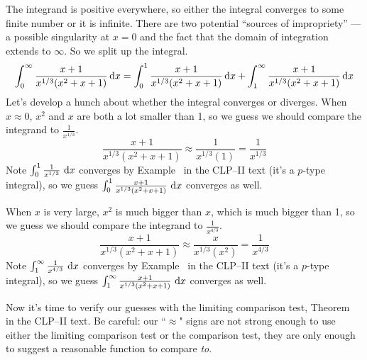 \begin{solution}
The integrand is positive everywhere, so either the integral
converges to some finite number or it is infinite. There are two potential
``sources of impropriety'' --- a possible singularity at $x=0$ and
the fact that the domain of integration extends to $\infty$.
So we split up the integral.
\begin{align*}
\int_0^\infty\frac{x+1}{x^{1/3}(x^2+x+1)}\,\mathrm{d}x
= \int_0^1\frac{x+1}{x^{1/3}(x^2+x+1)}\,\mathrm{d}x
  +\int_1^\infty\frac{x+1}{x^{1/3}(x^2+x+1)}\,\mathrm{d}x
\end{align*}
Let's develop a hunch about whether the integral converges or diverges. When $x\approx 0$,  $x^2$ and $x$ are both a lot smaller than 1, so we guess we should compare the integrand to $\frac{1}{x^{1/3}}$.
\begin{equation*}
\frac{x+1}{x^{1/3}(x^2+x+1)} \approx \frac{1}{x^{1/3}(1)} =
                                      \frac{1}{x^{1/3}}
\end{equation*}
Note $\int_0^1 \frac{1}{x^{1/3}}~\mathrm{d}x$ converges by Example~
 in the CLP--II text (it's a $p$-type integral), so we guess $\int_0^1 \frac{x+1}{x^{1/3}(x^2+x+1)}~\mathrm{d}x$ converges as well.

When $x$ is very large, $x^2$ is much bigger than $x$, which is much bigger than 1, so we guess we should compare the integrand to $\frac{1}{x^{4/3}}$.
\begin{equation*}
\frac{x+1}{x^{1/3}(x^2+x+1)} \approx \frac{x}{x^{1/3}(x^2)} =
                                      \frac{1}{x^{4/3}}
\end{equation*}
Note $\int_1^\infty \frac{1}{x^{4/3}}~\mathrm{d}x$ converges by Example~ in the CLP--II text (it's a $p$-type integral), so we guess $\int_1^\infty \frac{x+1}{x^{1/3}(x^2+x+1)}~\mathrm{d}x$ converges as well.

Now it's time to verify our guesses with the limiting comparison test, Theorem~ in the CLP--II text. Be careful:
our ``$\approx$" signs are not strong enough to use either the limiting comparison test or the comparison test, they are only enough to suggest a reasonable function to compare \emph{to}.


\end{solution}
